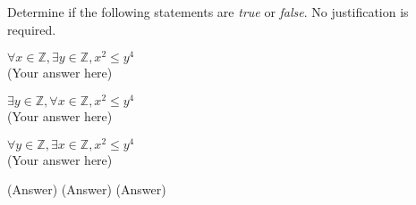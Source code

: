 \documentclass[11pt]{homework}
\newcommand{\integers}{\mathbb{Z}}
\begin{document}
\maketitle


%

\question
Determine if the following statements are \emph{true} or \emph{false}. No justification is required.

\begin{alphaparts}
    \questionpart $\forall x \in \integers, \exists y \in \integers, x^2 \leq y^4$ \\
    (Your answer here)

    \questionpart $\exists y \in \integers, \forall x \in \integers, x^2 \leq y^4$ \\
    (Your answer here)

    \questionpart $\forall y \in \integers, \exists x \in \integers, x^2 \leq y^4$\\
    (Your answer here)

\end{alphaparts}

\question
\begin{alphaparts}
    \questionpart (Answer)
    \questionpart (Answer)
    \questionpart (Answer)
\end{alphaparts}
\end{document}
